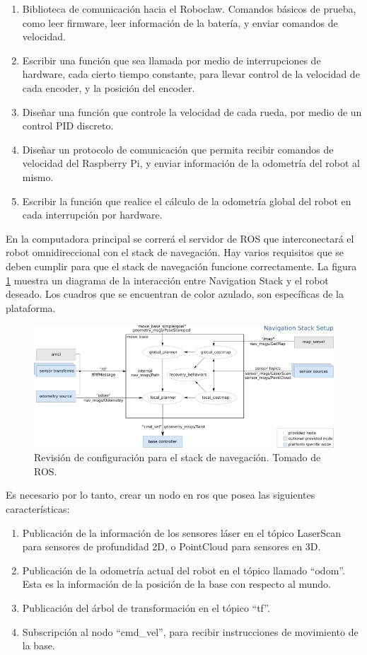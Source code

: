\begin{enumerate}
\item Biblioteca de comunicación hacia el Roboclaw. Comandos básicos de prueba, como leer firmware, leer información de la batería, y enviar comandos de velocidad.
\item Escribir una función que sea llamada por medio de interrupciones de hardware, cada cierto tiempo constante, para llevar control de la velocidad de cada encoder, y la posición del encoder.
\item Diseñar una función que controle la velocidad de cada rueda, por medio de un control PID discreto.
\item Diseñar un protocolo de comunicación que permita recibir comandos de velocidad del Raspberry Pi, y enviar información de la odometría del robot al mismo.
\item Escribir la función que realice el cálculo de la odometría global del robot en cada interrupción por hardware.
\end{enumerate}

En la computadora principal se correrá el servidor de ROS que interconectará el robot omnidireccional con el stack de navegación. Hay varios requisitos que se deben cumplir para que el stack de navegación funcione correctamente. La figura \ref{F:navigation_stack} muestra un diagrama de la interacción entre Navigation Stack y el robot deseado. Los cuadros que se encuentran de color azulado, son específicas de la plataforma.

\begin{figure}[H]
\centering
\includegraphics[scale=0.7]{imagenes/overview_tf_small.png}
\caption{Revisión de configuración para el stack de navegación. Tomado de ROS.}
\label{F:navigation_stack}
\end{figure}

Es necesario por lo tanto, crear un nodo en ros que posea las siguientes características:

\begin{enumerate}
\item Publicación de la información de los sensores láser en el tópico LaserScan para sensores de profundidad 2D, o PointCloud para sensores en 3D.
\item Publicación de la odometría actual del robot en el tópico llamado ``odom''. Esta es la información de la posición de la base con respecto al mundo.
\item Publicación del árbol de transformación en el tópico ``tf''.
\item Subscripción al nodo ``cmd\_vel'', para recibir instrucciones de movimiento de la base.
\end{enumerate}

